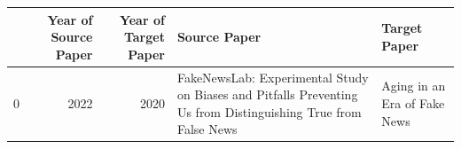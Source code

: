 \begin{tabular}{lrrll}
\toprule
 & Year of Source Paper & Year of Target Paper & Source Paper & Target Paper \\
\midrule
0 & 2022 & 2020 & FakeNewsLab: Experimental Study on Biases and Pitfalls Preventing Us from Distinguishing True from False News & Aging in an Era of Fake News \\
\bottomrule
\end{tabular}
